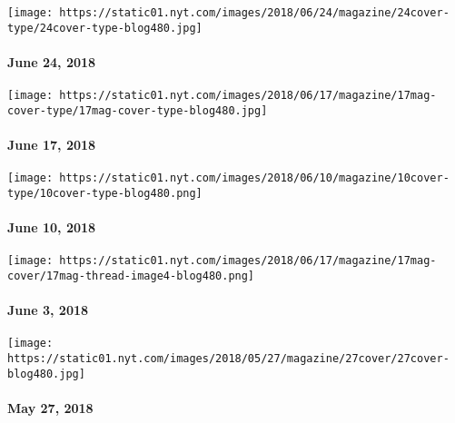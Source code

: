 \href{https://www.nytimes.com/issue/magazine/2018/06/20/the-62418-issue}{}

\texttt{[image: https://static01.nyt.com/images/2018/06/24/magazine/24cover-type/24cover-type-blog480.jpg]}

\hypertarget{june-24-2018}{%
\paragraph{June 24, 2018}\label{june-24-2018}}

\href{https://www.nytimes.com/issue/magazine/2018/06/14/61718-issue}{}

\texttt{[image: https://static01.nyt.com/images/2018/06/17/magazine/17mag-cover-type/17mag-cover-type-blog480.jpg]}

\hypertarget{june-17-2018}{%
\paragraph{June 17, 2018}\label{june-17-2018}}

\href{https://www.nytimes.com/interactive/2018/06/07/magazine/new-york-love-city.html}{}

\texttt{[image: https://static01.nyt.com/images/2018/06/10/magazine/10cover-type/10cover-type-blog480.png]}

\hypertarget{june-10-2018}{%
\paragraph{June 10, 2018}\label{june-10-2018}}

\href{https://www.nytimes.com/issue/magazine/2018/06/13/6318-issue}{}

\texttt{[image: https://static01.nyt.com/images/2018/06/17/magazine/17mag-cover/17mag-thread-image4-blog480.png]}

\hypertarget{june-3-2018}{%
\paragraph{June 3, 2018}\label{june-3-2018}}

\href{https://www.nytimes.com/issue/magazine/2018/05/25/052718-issue}{}

\texttt{[image: https://static01.nyt.com/images/2018/05/27/magazine/27cover/27cover-blog480.jpg]}

\hypertarget{may-27-2018}{%
\paragraph{May 27, 2018}\label{may-27-2018}}

